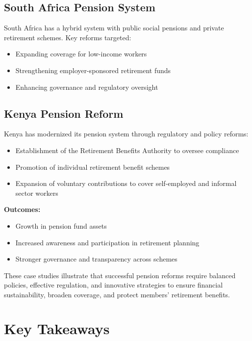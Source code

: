 \documentclass[12pt,a4paper]{article}
\begin{document}
\subsection{South Africa Pension System}

South Africa has a hybrid system with public social pensions and private retirement schemes. Key reforms targeted:
\begin{itemize}
    \item Expanding coverage for low-income workers
    \item Strengthening employer-sponsored retirement funds
    \item Enhancing governance and regulatory oversight
\end{itemize}

\subsection{Kenya Pension Reform}

Kenya has modernized its pension system through regulatory and policy reforms:
\begin{itemize}
    \item Establishment of the Retirement Benefits Authority to oversee compliance
    \item Promotion of individual retirement benefit schemes
    \item Expansion of voluntary contributions to cover self-employed and informal sector workers
\end{itemize}

\textbf{Outcomes:}
\begin{itemize}
    \item Growth in pension fund assets
    \item Increased awareness and participation in retirement planning
    \item Stronger governance and transparency across schemes
\end{itemize}

These case studies illustrate that successful pension reforms require balanced policies, effective regulation, and innovative strategies to ensure financial sustainability, broaden coverage, and protect members' retirement benefits.

\section{Key Takeaways}
\end{document}
